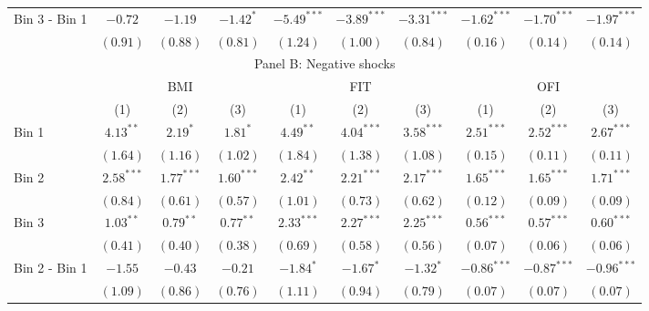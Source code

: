 \begin{tabular}{lccccccccc}
  Bin 3 - Bin 1 & $-0.72$ & $-1.19$ & $-1.42^{*}$ & $-5.49^{***}$ & $-3.89^{***}$ & $-3.31^{***}$ & $-1.62^{***}$ & $-1.70^{***}$ & $-1.97^{***}$ \\

   & $(0.91)$ & $(0.88)$ & $(0.81)$ & $(1.24)$ & $(1.00)$ & $(0.84)$ & $(0.16)$ & $(0.14)$ & $(0.14)$ \\

  \hline \multicolumn{10}{c}{Panel B: Negative shocks} \\

  \hline

  & \multicolumn{3}{c}{BMI} & \multicolumn{3}{c}{FIT} & \multicolumn{3}{c}{OFI} \\

  \cmidrule(lr){2-4} \cmidrule(lr){5-7} \cmidrule(lr){8-10}

  & (1) & (2) & (3) & (1) & (2) & (3) & (1) & (2) & (3) \\

  Bin 1 & $4.13^{**}$ & $2.19^{*}$ & $1.81^{*}$ & $4.49^{**}$ & $4.04^{***}$ & $3.58^{***}$ & $2.51^{***}$ & $2.52^{***}$ & $2.67^{***}$ \\

   & $(1.64)$ & $(1.16)$ & $(1.02)$ & $(1.84)$ & $(1.38)$ & $(1.08)$ & $(0.15)$ & $(0.11)$ & $(0.11)$ \\

  Bin 2 & $2.58^{***}$ & $1.77^{***}$ & $1.60^{***}$ & $2.42^{**}$ & $2.21^{***}$ & $2.17^{***}$ & $1.65^{***}$ & $1.65^{***}$ & $1.71^{***}$ \\

   & $(0.84)$ & $(0.61)$ & $(0.57)$ & $(1.01)$ & $(0.73)$ & $(0.62)$ & $(0.12)$ & $(0.09)$ & $(0.09)$ \\

  Bin 3 & $1.03^{**}$ & $0.79^{**}$ & $0.77^{**}$ & $2.33^{***}$ & $2.27^{***}$ & $2.25^{***}$ & $0.56^{***}$ & $0.57^{***}$ & $0.60^{***}$ \\

   & $(0.41)$ & $(0.40)$ & $(0.38)$ & $(0.69)$ & $(0.58)$ & $(0.56)$ & $(0.07)$ & $(0.06)$ & $(0.06)$ \\

  Bin 2 - Bin 1 & $-1.55$ & $-0.43$ & $-0.21$ & $-1.84^{*}$ & $-1.67^{*}$ & $-1.32^{*}$ & $-0.86^{***}$ & $-0.87^{***}$ & $-0.96^{***}$ \\

   & $(1.09)$ & $(0.86)$ & $(0.76)$ & $(1.11)$ & $(0.94)$ & $(0.79)$ & $(0.07)$ & $(0.07)$ & $(0.07)$ \\


\end{tabular}
